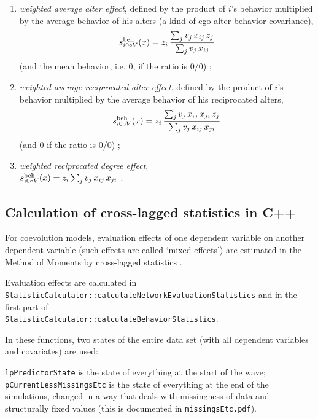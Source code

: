 \documentclass[a4paper,12pt,fleqn]{article}
\newcommand{\vit}{\theenumi}
\begin{document}
\begin{enumerate}
\hspace{-2em}
Let us omit the popularity-interaction effects,
   which already contain a weight.

 \addtocounter{enumi}{4}


 \item {\em weighted average alter effect}, defined by the product of $i$'s
 behavior multiplied by the average behavior of his alters (a kind
 of ego-alter behavior covariance),
 \[
 s^{\rm beh}_{i\vit \circ V}(x) =  z_i \, \frac{  \sum_j v_j\,x_{ij}\, z_j }
                                { \sum_j v_j \,x_{ij} }
  \]
 (and the mean behavior, i.e. $0$, if the ratio is 0/0) ;

 \item {\em weighted average reciprocated alter effect}, defined by the product of $i$'s
 behavior multiplied by the average behavior of his reciprocated alters,
 \[
 s^{\rm beh}_{i\vit \circ V}(x) =  z_i \, \frac{\sum_j v_j \, x_{ij}\, x_{ji}\, z_j }
                                {\sum_j v_j\, x_{ij}\, x_{ji} }
\]
 (and 0 if the ratio is 0/0) ;

\addtocounter{enumi}{3}

 \item {\em weighted reciprocated degree effect}, \\
 $s^{\rm beh}_{i\vit \circ V}(x) = z_i \sum_j v_j \, x_{ij}\,x_{ji} $ .

\end{enumerate}

\subsection{Calculation of cross-lagged statistics in C++}

For coevolution models, evaluation effects of one dependent variable on another
dependent variable (such effects are called `mixed effects')
are estimated in the Method of Moments by cross-lagged
statistics \citep[][formulae 26 and 27]{SnijdersEA07}.

Evaluation effects are calculated in\\
\texttt{StatisticCalculator::calculateNetworkEvaluationStatistics} and
in the first part of\\
\texttt{StatisticCalculator::calculateBehaviorStatistics}.

In these functions, two states of the entire data set (with all dependent
variables and covariates) are used:
\smallskip

\texttt{lpPredictorState} is the state of everything at the start of the wave;\\[0.3em]
\texttt{pCurrentLessMissingsEtc} is the state of everything
at the end of the simulations, changed in a way that deals with missingness
of data and structurally fixed values
(this is documented in \texttt{missingsEtc.pdf}).
\smallskip
\end{document}

